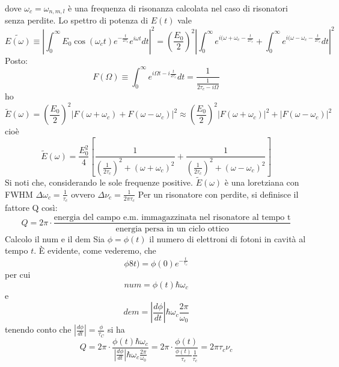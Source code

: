 \documentclass{book}
\def \w {\omega}
\def \D {\Delta}
\theoremstyle{remark}
\begin{document}
dove $\omega_c = \omega_{n,m,l}$ è una frequenza di risonanza calcolata nel caso di risonatori senza perdite. Lo spettro di potenza di $E(t)$ vale
\begin{equation*}
\tilde{E(\w)} \equiv \left| \int_0^\infty E_0 \cos(\omega_c t) e^{-\frac{t}{2\tau_c}} e^{i\omega t}
dt \right|^2 = \left( \frac{E_0}{2}\right)^2 \left| \int_0^\infty e^{i(\w+\omega_c-\frac{t}{2\tau_c}} + \int_0^\infty e^{i(\w-\omega_c-\frac{t}{2\tau_c}} dt \right|^2
\end{equation*}
Posto:
\begin{equation*}
F(\Omega) \equiv \int_0^\infty e^{i\Omega t - i\frac{t}{2\tau_c}} dt = \frac{1}{\frac{1}{2\tau_c - i\Omega}}
\end{equation*}
ho
\begin{equation*}
\tilde{E}(\w) = \left(\frac{E_0}{2}\right)^2 \left| F(\omega + \omega_c) + F(\omega - \omega_c)\right|^2 \approx \left(\frac{E_0}{2}\right)^2 \left|F(\omega + \omega_c)\right|^2 + \left|F(\omega - \omega_c)\right|^2
\end{equation*}cioè
\begin{equation*}
\tilde{E}(\w) = \frac{E_0^2}{4} \left[ \frac{1}{\left(\frac{1}{2\tau_c}\right)^2 + (\w+\omega_c)^2} + \frac{1}{\left(\frac{1}{2\tau_c}\right)^2 + (\w-\omega_c)^2}\right]
\end{equation*}
Si noti che, considerando le sole frequenze positive. $\tilde{E}(\w)$ è una loretziana con FWHM $ \D \omega_c = \frac{1}{\tau_c}$ ovvero $\D \nu_c = \frac{1}{2\pi\tau_c}$
Per un risonatore con perdite, si definisce il fattore Q così:
\begin{equation*}
Q = 2\pi \cdot \frac{\text{energia del campo e.m. immagazzinata nel risonatore al tempo t}}{\text{energia persa in un ciclo ottico}}
\end{equation*}
Calcolo il num e il dem
Sia $\phi = \phi(t)$ il numero di elettroni di fotoni in cavità al tempo $t$. È evidente, come vederemo, che
\begin{equation*}
\phi8t) = \phi(0)e^{-\frac{t}{\tau_c}}
\end{equation*}
per cui
\begin{equation*}
num = \phi(t) \hbar \omega_c
\end{equation*}
e
\begin{equation*}
dem = \left| \frac{d\phi}{dt}\right| \hbar \omega_c \frac{2\pi}{\omega_0}
\end{equation*}
tenendo conto che $\left|\frac{d\phi}{dt}\right| = \frac{\phi}{\tau_C}$
si ha
\begin{equation*}
Q = 2\pi \cdot \frac{\phi(t) \hbar \omega_c}{\left|\frac{d\phi}{dt}\right| \hbar \omega_c \frac{2\pi}{\omega_0}} = 2\pi \cdot \frac{\phi(t)}{\frac{\phi(t)}{\tau_c} \frac{1}{\tau_c}} = 2\pi \tau_c \nu_c
\end{equation*}
\end{document}
